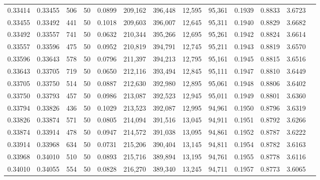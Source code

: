 \begin{tabular}{rrrrrrrrrrrrr}
0.33414 & 0.33455 &   506 &  50 &                                     0.0899 & 209,162 & 396,448 &  12,595 &  95,361 & 0.1939 & 0.8833 & 3.6723 \\
0.33455 & 0.33492 &   441 &  50 &                                     0.1018 & 209,603 & 396,007 &  12,645 &  95,311 & 0.1940 & 0.8829 & 3.6682 \\
0.33492 & 0.33557 &   741 &  50 &                                     0.0632 & 210,344 & 395,266 &  12,695 &  95,261 & 0.1942 & 0.8824 & 3.6614 \\
0.33557 & 0.33596 &   475 &  50 &                                     0.0952 & 210,819 & 394,791 &  12,745 &  95,211 & 0.1943 & 0.8819 & 3.6570 \\
0.33596 & 0.33643 &   578 &  50 &                                     0.0796 & 211,397 & 394,213 &  12,795 &  95,161 & 0.1945 & 0.8815 & 3.6516 \\
0.33643 & 0.33705 &   719 &  50 &                                     0.0650 & 212,116 & 393,494 &  12,845 &  95,111 & 0.1947 & 0.8810 & 3.6449 \\
0.33705 & 0.33750 &   514 &  50 &                                     0.0887 & 212,630 & 392,980 &  12,895 &  95,061 & 0.1948 & 0.8806 & 3.6402 \\
0.33750 & 0.33793 &   457 &  50 &                                     0.0986 & 213,087 & 392,523 &  12,945 &  95,011 & 0.1949 & 0.8801 & 3.6360 \\
0.33794 & 0.33826 &   436 &  50 &                                     0.1029 & 213,523 & 392,087 &  12,995 &  94,961 & 0.1950 & 0.8796 & 3.6319 \\
0.33826 & 0.33874 &   571 &  50 &                                     0.0805 & 214,094 & 391,516 &  13,045 &  94,911 & 0.1951 & 0.8792 & 3.6266 \\
0.33874 & 0.33914 &   478 &  50 &                                     0.0947 & 214,572 & 391,038 &  13,095 &  94,861 & 0.1952 & 0.8787 & 3.6222 \\
0.33914 & 0.33968 &   634 &  50 &                                     0.0731 & 215,206 & 390,404 &  13,145 &  94,811 & 0.1954 & 0.8782 & 3.6163 \\
0.33968 & 0.34010 &   510 &  50 &                                     0.0893 & 215,716 & 389,894 &  13,195 &  94,761 & 0.1955 & 0.8778 & 3.6116 \\
0.34010 & 0.34055 &   554 &  50 &                                     0.0828 & 216,270 & 389,340 &  13,245 &  94,711 & 0.1957 & 0.8773 & 3.6065 \\

\end{tabular}
